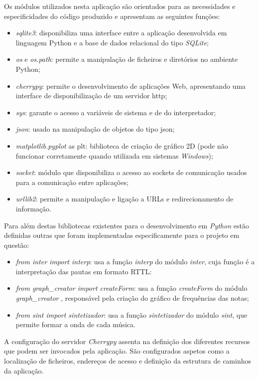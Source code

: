\documentclass[11pt,openany,twoside]{report}
\begin{document}
Os módulos utilizados nesta aplicação são orientados para as necessidades e especificidades do código produzido e apresentam as seguintes funções:
\begin{itemize}
  \item \textit{sqlite3}: disponibiliza uma interface entre a aplicação desenvolvida em linguagem Python e a base de dados relacional do tipo \textit{SQLite};
  \item \textit{os} e \textit{os.path}: permite a manipulação de ficheiros e diretórios no ambiente Python;
  \item \textit{cherrypy}: permite o desenvolvimento de aplicações Web, apresentando uma interface de disponibilização de um servidor \ac{http};
  \item \textit{sys}: garante o acesso a variáveis de sistema e de do interpretador;
  \item \textit{json}: usado na manipulação de objetos do tipo \acs{json};
  \item \textit{matplotlib.pyplot} as plt: biblioteca de criação de gráfico 2D (pode não funcionar corretamente quando utilizada em sistemas \textit{Windows});
  \item \textit{socket}: módulo que disponibiliza o acesso ao sockets de comunicação usados para a comunicação entre aplicações;
  \item \textit{urllib2}: permite a manipulação e ligação a URLs e redirecionamento de informação.
\end{itemize}

Para além destas bibliotecas existentes para o desenvolvimento em \textit{Python} estão definidas outras que foram implementadas especificamente para o projeto em questão:

\begin{itemize}
  \item \textit{from inter import interp}: usa a função \textit{interp} do módulo \textit{inter}, cuja função é a interpretação das pautas em formato RTTL:
  \item \textit{from graph\_creator import createForm}: usa a função \textit{createForm} do módulo \textit{graph\_creator} , responsável pela criação do gráfico de frequências das notas;
  \item \textit{from sint import sintetizador}: usa a função \textit{sintetizador} do módulo \textit{sint}, que permite formar a onda de cada música.
\end{itemize}

A configuração do servidor \textit{Cherrypy} assenta na definição dos diferentes recursos que podem ser invocados pela aplicação. São configurados aspetos como a localização de ficheiros, endereços de acesso  e definição da estrutura de caminhos da aplicação.
\end{document}
